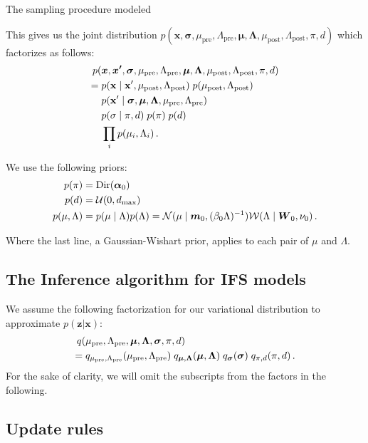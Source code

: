 \documentclass[10pt,a4paper,oneside]{article}
\theoremstyle{definition}
\newcommand{\p}{\mbox{\,.}}
\newcommand{\bD}{\boldsymbol\Lambda}
\newcommand{\bm}{\boldsymbol\mu}
\newcommand{\cN}{{\cal N}}
\newcommand{\bs}[1]{{\boldsymbol {#1} }}
\begin{document}
The sampling procedure modeled 

This gives us the joint distribution $p(\bs{x}, \bs{\sigma}, \mu_\text{pre}, \Lambda_\text{pre}, \bm, \bD, \mu_\text{post}, \Lambda_\text{post}, \pi, d)$ which factorizes as follows:
\begin{align}
p(&\bs{x}, \bs{x'}, \bs{\sigma}, \mu_\text{pre}, \Lambda_\text{pre}, \bm, \bD, \mu_\text{post}, \Lambda_\text{post}, \pi, d) \notag\\ 
=\;& p(\mathbf{x} \mid \mathbf{x'}, \mu_\text{post}, \Lambda_\text{post}) \; p(\mu_\text{post}, \Lambda_\text{post}) \notag\\
& p(\mathbf{x'} \mid \bs{\sigma}, \bm, \bD, \mu_\text{pre}, \Lambda_\text{pre}) \notag\\
& p(\mathbf{\sigma} \mid \pi, d) \; p(\pi) \; p(d) \notag\\
& \prod_i p(\mu_i, \Lambda_i) \p \label{line:factorization}\\
\end{align}

We use the following priors:
\begin{align*}
p(\pi) &= \text{Dir}(\bs{\alpha}_0) \\
p(d) &= {\cal U}(0, d_\text{max}) \\
p(\mu, \Lambda) &= p(\mu \mid \Lambda) p(\Lambda) = \cN(\mu \mid \bs{m}_0, (\beta_0\Lambda)^{-1}) {\cal W}(\Lambda \mid \bs{W}_0, \nu_0) \p
\end{align*}

Where the last line, a Gaussian-Wishart prior, applies to each pair of $\mu$ and $\Lambda$.

\subsection{The Inference algorithm for IFS models}
We assume the following factorization for our variational distribution to approximate  $p(\bs{z}|\bs{x})$:
\begin{align*}
q(& \mu_\text{pre}, \Lambda_\text{pre}, \bm, \bD, \bs{\sigma}, \pi, d) \\ 
=\;&  q_{\mu_\text{pre}, \Lambda_\text{pre}}(\mu_\text{pre}, \Lambda_\text{pre}) \; q_{\bm, \bD}(\bm, \bD)\; q_{\bs{\sigma}}(\bs{\sigma}) \; q_{\pi, d}(\pi, d) \p \\
\end{align*}
For the sake of clarity, we will omit the subscripts from the factors in the following.

\subsection{Update rules}
\end{document}
